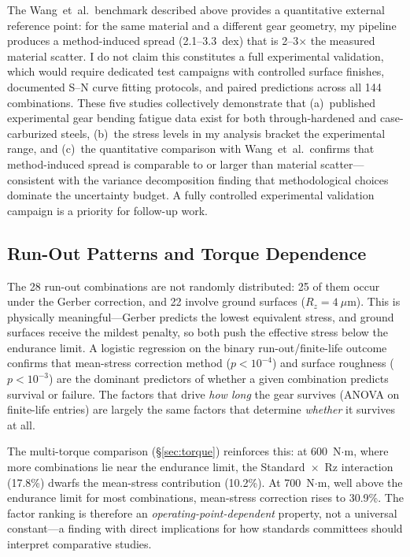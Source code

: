 \documentclass[12pt,a4paper]{article}
\begin{document}
The Wang~et~al.\ benchmark described above provides a quantitative
external reference point: for the same material and a different gear
geometry, my pipeline produces a method-induced spread (2.1--3.3~dex)
that is 2--3$\times$ the measured material scatter. I do not claim
this constitutes a full experimental validation, which would require
dedicated test campaigns with controlled surface finishes, documented
S--N curve fitting protocols, and paired predictions across all 144
combinations. These five studies collectively demonstrate that
(a)~published experimental gear bending fatigue data exist for both
through-hardened and case-carburized steels, (b)~the stress levels in
my analysis bracket the experimental range, and (c)~the quantitative
comparison with Wang~et~al.\ confirms that method-induced spread is
comparable to or larger than material scatter---consistent with the
variance decomposition finding that methodological choices dominate
the uncertainty budget. A fully controlled experimental validation
campaign is a priority for follow-up work.

\subsection{Run-Out Patterns and Torque Dependence}

The 28 run-out combinations are not randomly distributed: 25 of them
occur under the Gerber correction, and 22 involve ground surfaces
($R_z = 4~\mu$m). This is physically meaningful---Gerber predicts the
lowest equivalent stress, and ground surfaces receive the mildest
penalty, so both push the effective stress below the endurance limit.
A logistic regression on the binary run-out/finite-life outcome
confirms that mean-stress correction method ($p < 10^{-4}$) and
surface roughness ($p < 10^{-3}$) are the dominant predictors of
whether a given combination predicts survival or failure. The factors
that drive \emph{how long} the gear survives (ANOVA on finite-life
entries) are largely the same factors that determine \emph{whether} it
survives at all.

The multi-torque comparison (\S\ref{sec:torque}) reinforces this:
at 600~N$\cdot$m, where more combinations lie near the endurance
limit, the Standard~$\times$~Rz interaction (17.8\%) dwarfs the
mean-stress contribution (10.2\%). At 700~N$\cdot$m, well above the
endurance limit for most combinations, mean-stress correction rises to
30.9\%. The factor ranking is therefore an \emph{operating-point-dependent}
property, not a universal constant---a finding with direct implications
for how standards committees should interpret comparative studies.
\end{document}
